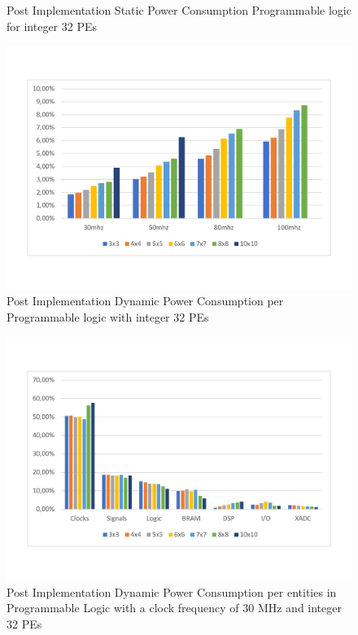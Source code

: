 \begin{itemize}
\begin{figure}[!htbp]
\caption{Post Implementation Static Power Consumption Programmable logic for integer 32 PEs }
\label{fig:staticpowint32}
\end{figure}
\begin{figure}[!htbp]
\centering
\captionsetup{justification=centering}
\includegraphics[scale=0.5,angle=0]{./figure/graphs/power_pldyn_int32_freq.pdf}
\caption{Post Implementation Dynamic Power Consumption per Programmable logic with integer 32 PEs}
\label{fig:dynpowint32}
\end{figure}
\begin{figure}[!htbp]
\centering
\captionsetup{justification=centering}
\includegraphics[scale=0.6,angle=0]{./figure/graphs/power_pldyn_div_int32_freq_30mhz.pdf}
\caption{Post Implementation Dynamic Power Consumption per entities in Programmable Logic with a clock frequency of 30 MHz and integer 32 PEs}
\label{fig:dynpowint32ent30}
\end{figure}


\end{itemize}

